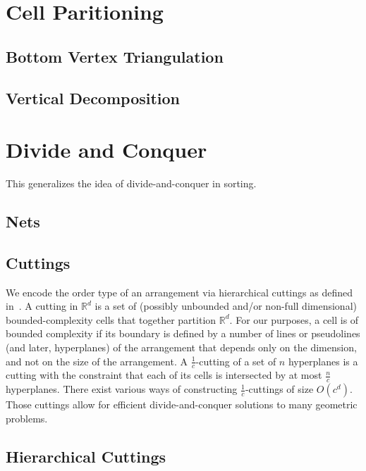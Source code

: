 \section{Cell Paritioning}

\subsection{Bottom Vertex Triangulation}

\subsection{Vertical Decomposition}


\section{Divide and Conquer}

This generalizes the idea of divide-and-conquer in sorting.

\subsection{Nets}

\subsection{Cuttings}

We encode the order type of an arrangement via
hierarchical cuttings as defined in~\cite{C93}. A cutting in \(\mathbb{R}^d\)
is a set of (possibly unbounded and/or non-full dimensional)
bounded-complexity cells that together partition \(\mathbb{R}^{d}\).
%
For our purposes, a cell is of bounded complexity if its boundary is defined by
a number of lines or pseudolines (and later, hyperplanes) of the arrangement
that depends only on the dimension, and not on the size of the arrangement.
%
A \(\frac{1}{c}\)-cutting of a set of \(n\) hyperplanes is a cutting with the
constraint that each of its cells is intersected by at most \(\frac{n}{c}\)
hyperplanes. There exist various ways of constructing \(\frac{1}{c}\)-cuttings of
size \(O(c^d)\).
Those cuttings allow for efficient divide-and-conquer
solutions to many geometric problems.


\subsection{Hierarchical Cuttings}





